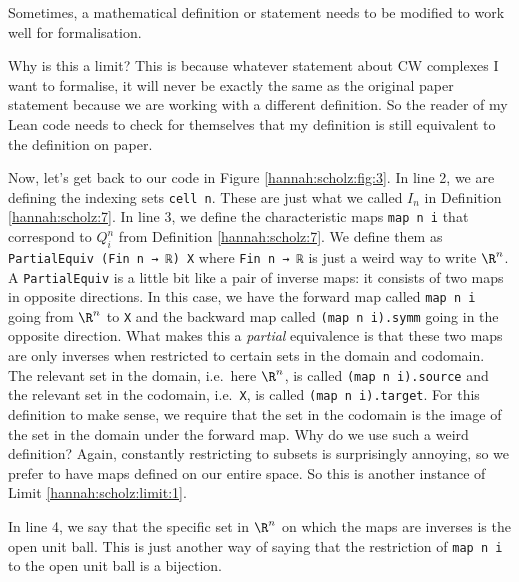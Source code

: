 \begin{limit}\label{hannah:scholz:limit:1}
    Sometimes, a mathematical definition or statement needs to be modified to work well for formalisation. 
\end{limit}

Why is this a limit? This is because whatever statement about CW complexes I want to formalise, it will never be exactly the same as the original paper statement because we are working with a different definition. So the reader of my Lean code needs to check for themselves that my definition is still equivalent to the definition on paper. 

Now, let's get back to our code in Figure \ref{hannah:scholz:fig:3}. In line 2, we are defining the indexing sets \lstinline[language=lean]|cell n|. These are just what we called $I_n$ in Definition \ref{hannah:scholz:7}.
In line 3, we define the characteristic maps \lstinline[language=lean]|map n i| that correspond to $Q_i^n$ from Definition \ref{hannah:scholz:7}. We define them as \lstinline[language=lean]|PartialEquiv (Fin n → ℝ) X| where \lstinline[language=lean]|Fin n → ℝ| is just a weird way to write $\R^n$. A \lstinline[language=lean]|PartialEquiv| is a little bit like a pair of inverse maps: it consists of two maps in opposite directions. In this case, we have the forward map called \lstinline[language=lean]|map n i| going from $\R^n$ to \lstinline[language=lean]|X| and the backward map called \lstinline[language=lean]|(map n i).symm| going in the opposite direction. What makes this a \emph{partial} equivalence is that these two maps are only inverses when restricted to certain sets in the domain and codomain. The relevant set in the domain, i.e.\ here $\R^n$, is called \lstinline[language=lean]|(map n i).source| and the relevant set in the codomain, i.e.\ \lstinline[language=lean]|X|, is called \lstinline[language=lean]|(map n i).target|. For this definition to make sense, we require that the set in the codomain is the image of the set in the domain under the forward map. Why do we use such a weird definition? Again, constantly restricting to subsets is surprisingly annoying, so we prefer to have maps defined on our entire space. So this is another instance of Limit \ref{hannah:scholz:limit:1}. 

In line 4, we say that the specific set in $\R^n$ on which the maps are inverses is the open unit ball. This is just another way of saying that the restriction of \lstinline[language=lean]|map n i| to the open unit ball is a bijection. 

